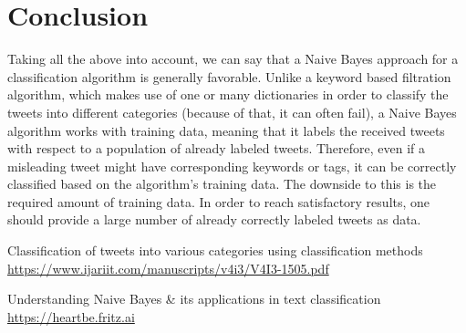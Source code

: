 \documentclass{article}
\begin{document}
\section{Conclusion}
\large
{
\quad
Taking all the above into account, we can say that a Naive Bayes approach for a classification algorithm is generally favorable. Unlike a keyword based filtration algorithm, which makes use of one or many dictionaries in order to classify the tweets into different categories (because of that, it can often fail), a Naive Bayes algorithm works with training data, meaning that it labels the received tweets with respect to a population of already labeled tweets. Therefore, even if a misleading tweet might have corresponding keywords or tags, it can be correctly classified based on the algorithm's training data. The downside to this is the required amount of training data. In order to reach satisfactory results, one should provide a large number of already correctly labeled tweets as data.
}

\begin{thebibliography}{1}

    Classification of tweets into various categories using classification methods
    \url{https://www.ijariit.com/manuscripts/v4i3/V4I3-1505.pdf}
    
    Understanding Naive Bayes \& its applications in text classification
    \url{https://heartbe.fritz.ai}
\end{thebibliography}
\end{document}
